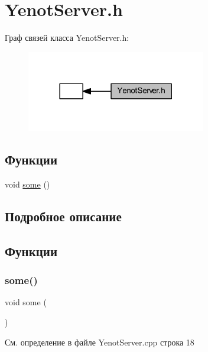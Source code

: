 \hypertarget{group__serveryenotserverh}{}\section{Yenot\+Server.\+h}
\label{group__serveryenotserverh}
Граф связей класса Yenot\+Server.\+h\+:\nopagebreak
\begin{figure}[H]
\begin{center}
\leavevmode
\includegraphics[width=222pt]{group__serveryenotserverh}
\end{center}
\end{figure}
\subsection*{Функции}
\begin{DoxyCompactItemize}
\item 
void \mbox{\hyperlink{group__serveryenotserverh_ga3bf507bc2b43ea8ed45bdfeaf8d11171}{some}} ()
\end{DoxyCompactItemize}


\subsection{Подробное описание}


\subsection{Функции}
\mbox{\label{group__serveryenotserverh_ga3bf507bc2b43ea8ed45bdfeaf8d11171}} 
\subsubsection{\texorpdfstring{some()}{some()}}
{\footnotesize\ttfamily void some (\begin{DoxyParamCaption}{ }\end{DoxyParamCaption})}



См. определение в файле Yenot\+Server.\+cpp строка 18

